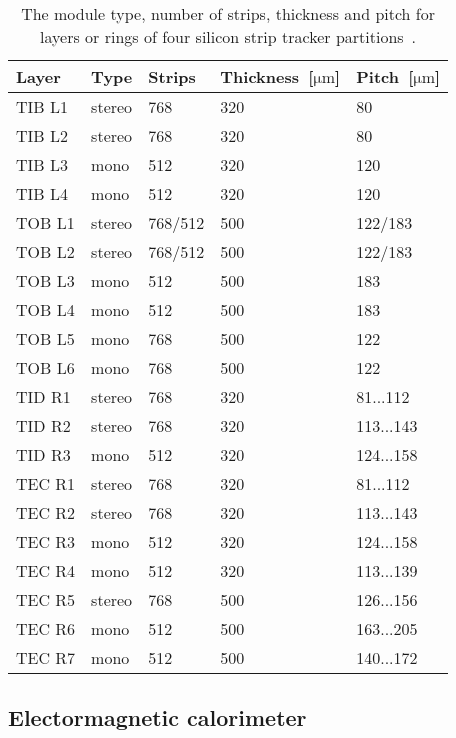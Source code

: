 \begin{table}[h]
\begin{center}
\begin{tabular}{|l|l|l|l|l|}
\hline
Layer & Type  & Strips & Thickness~[$\mathrm{\mu m}$] & Pitch~[$\mathrm{\mu m}$]  \\
\hline
\hline
TIB L1 & stereo & 768 & 320 & 80  \\
TIB L2 & stereo & 768 & 320 & 80  \\
TIB L3 & mono & 512 & 320 & 120  \\
TIB L4 & mono & 512 & 320 & 120 \\
\hline
TOB L1 & stereo & 768/512 & 500 & 122/183 \\
TOB L2 & stereo & 768/512 & 500 & 122/183 \\
TOB L3 & mono & 512 & 500 & 183 \\
TOB L4 & mono & 512 & 500 & 183 \\
TOB L5 & mono & 768 & 500 & 122 \\
TOB L6 & mono & 768 & 500 & 122 \\
\hline
TID R1 & stereo & 768 & 320 & 81...112  \\
TID R2 & stereo & 768 & 320 & 113...143  \\
TID R3 & mono & 512 & 320 & 124...158  \\
\hline
TEC R1 & stereo & 768 & 320 & 81...112  \\
TEC R2 & stereo & 768 & 320 & 113...143  \\
TEC R3 & mono & 512 & 320 & 124...158  \\
TEC R4 & mono & 512 & 320 & 113...139  \\
TEC R5 & stereo & 768 & 500 & 126...156  \\
TEC R6 & mono & 512 & 500 & 163...205  \\
TEC R7 & mono & 512 & 500 & 140...172  \\
\hline
\end{tabular}
\caption[Table caption text]{The module type, number of strips, thickness and pitch for layers or rings of four silicon strip tracker partitions~\cite{website:hephyPage}. }
\label{tab:trackerGeometries}
\end{center}
\end{table}

\subsection{Electormagnetic calorimeter}

